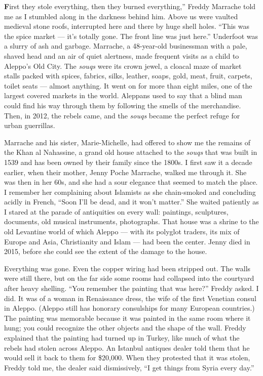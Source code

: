 \textbf{F}irst they stole everything, then they burned everything,''
Freddy Marrache told me as I stumbled along in the darkness behind him.
Above us were vaulted medieval stone roofs, interrupted here and there
by huge shell holes. ``This was the spice market --- it's totally gone.
The front line was just here.'' Underfoot was a slurry of ash and
garbage. Marrache, a 48-year-old businessman with a pale, shaved head
and an air of quiet alertness, made frequent visits as a child to
Aleppo's Old City. The \emph{souqs} were its crown jewel, a cloacal maze
of market stalls packed with spices, fabrics, silks, leather, soaps,
gold, meat, fruit, carpets, toilet seats --- almost anything. It went on
for more than eight miles, one of the largest covered markets in the
world. Aleppans used to say that a blind man could find his way through
them by following the smells of the merchandise. Then, in 2012, the
rebels came, and the \emph{souqs} became the perfect refuge for urban
guerrillas.

Marrache and his sister, Marie-Michelle, had offered to show me the
remains of the Khan al Nahassine, a grand old house attached to the
\emph{souqs} that was built in 1539 and has been owned by their family
since the 1800s. I first saw it a decade earlier, when their mother,
Jenny Poche Marrache, walked me through it. She was then in her 60s, and
she had a sour elegance that seemed to match the place. I remember her
complaining about Islamists as she chain-smoked and concluding acidly in
French, ``Soon I'll be dead, and it won't matter.'' She waited patiently
as I stared at the parade of antiquities on every wall: paintings,
sculptures, documents, old musical instruments, photographs. That house
was a shrine to the old Levantine world of which Aleppo --- with its
polyglot traders, its mix of Europe and Asia, Christianity and Islam ---
had been the center. Jenny died in 2015, before she could see the extent
of the damage to the house.

Everything was gone. Even the copper wiring had been stripped out. The
walls were still there, but on the far side some rooms had collapsed
into the courtyard after heavy shelling. ``You remember the painting
that was here?'' Freddy asked. I did. It was of a woman in Renaissance
dress, the wife of the first Venetian consul in Aleppo. (Aleppo still
has honorary consulships for many European countries.) The painting was
memorable because it was painted in the same room where it hung; you
could recognize the other objects and the shape of the wall. Freddy
explained that the painting had turned up in Turkey, like much of what
the rebels had stolen across Aleppo. An Istanbul antiques dealer told
them that he would sell it back to them for \$20,000. When they
protested that it was stolen, Freddy told me, the dealer said
dismissively, ``I get things from Syria every day.''

